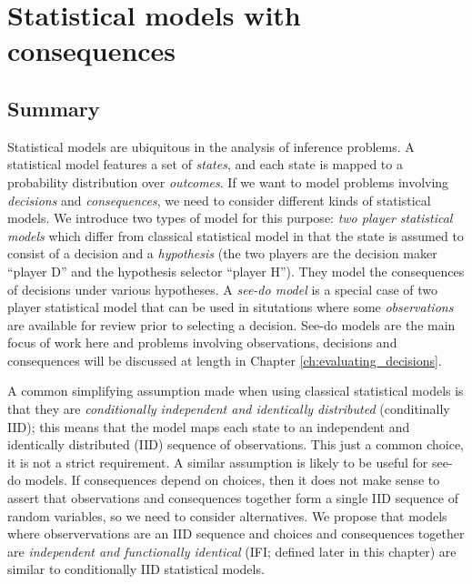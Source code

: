 

\chapter{Statistical models with consequences}\label{ch:2p_statmodels}

\section{Summary}

Statistical models are ubiquitous in the analysis of inference problems. A statistical model features a set of \emph{states}, and each state is mapped to a probability distribution over \emph{outcomes}. If we want to model problems involving \emph{decisions} and \emph{consequences}, we need to consider different kinds of statistical models. We introduce two types of model for this purpose: \emph{two player statistical models} which differ from classical statistical model in that the state is assumed to consist of a decision and a \emph{hypothesis} (the two players are the decision maker ``player D'' and the hypothesis selector ``player H''). They model the consequences of decisions under various hypotheses. A \emph{see-do model} is a special case of two player statistical model that can be used in situtations where some \emph{observations} are available for review prior to selecting a decision. See-do models are the main focus of work here and problems involving observations, decisions and consequences will be discussed at length in Chapter \ref{ch:evaluating_decisions}.

A common simplifying assumption made when using classical statistical models is that they are \emph{conditionally independent and identically distributed} (conditinally IID); this means that the model maps each state to an independent and identically distributed (IID) sequence of observations. This just a common choice, it is not a strict requirement. A similar assumption is likely to be useful for see-do models. If consequences depend on choices, then it does not make sense to assert that observations and consequences together form a single IID sequence of random variables, so we need to consider alternatives. We propose that models where observervations are an IID sequence and choices and consequences together are \emph{independent and functionally identical} (IFI; defined later in this chapter) are similar to conditionally IID statistical models. 

